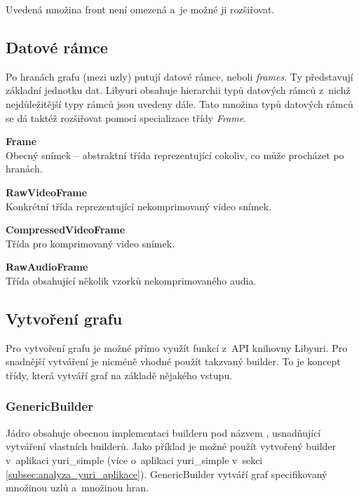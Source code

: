 \documentclass[thesis=M,czech]{FITthesis}[2012/06/26]
\begin{document}
Uvedená množina front není omezená a~je možné ji rozšiřovat.

\subsection{Datové rámce} \label{subsec:analyza_yuri_ramce}
Po hranách grafu (mezi uzly) putují datové rámce, neboli \textit{frames}. Ty představují základní jednotku dat. Libyuri obsahuje hierarchii typů datových rámců z~nichž nejdůležitější typy rámců jsou uvedeny dále. Tato množina typů datových rámců se dá taktéž rozšiřovat pomocí specializace třídy \textit{Frame}.

\begin{description}
  \item \textbf{Frame\\}
Obecný snímek -- abstraktní třída reprezentující cokoliv, co může procházet po hranách.
  \item \textbf{RawVideoFrame\\}
Konkrétní třída reprezentující nekomprimovaný video snímek. 
  \item \textbf{CompressedVideoFrame \\}
Třída pro komprimovaný video snímek.
  \item \textbf{RawAudioFrame\\}
Třída obsahující několik vzorků nekomprimovaného audia.
\end{description}

\subsection{Vytvoření grafu} \label{subsec:analyza_yuri_vytvoreni}
Pro vytvoření grafu je možné přímo využít funkcí z~API knihovny Libyuri. Pro snadnější vytváření je nicméně vhodné použít takzvaný builder. To je koncept třídy, která vytváří graf na základě nějakého vstupu. 

\subsubsection{GenericBuilder} \label{subsec:analyza_yuri_vytvoreni_generic}
Jádro obsahuje obecnou implementaci builderu pod názvem , usnadňující vytváření vlastních builderů. Jako příklad je možné použít vytvořený builder  v~aplikaci yuri\_simple (více o~aplikaci yuri\_simple v~sekci \ref{subsec:analyza_yuri_aplikace}). GenericBuilder vytváří graf specifikovaný množinou uzlů a~množinou hran.
\end{document}
